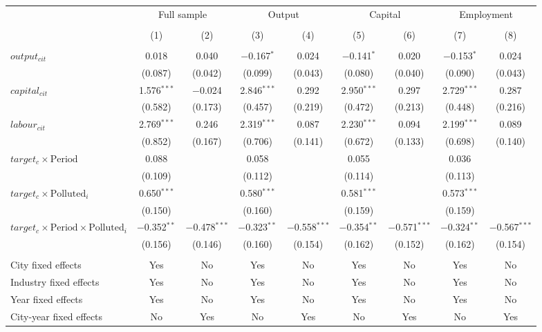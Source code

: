 \documentclass[12pt]{article}
\begin{document}
\begin{table}[!htb]
\begin{adjustbox}{width=\textwidth, totalheight=\baselineskip,keepaspectratio}
\begin{tabular}{@{\extracolsep{5pt}}lcccccccc}
\\[-1.8ex]
            &\multicolumn{2}{c}{Full sample}&\multicolumn{2}{c}{Output}&\multicolumn{2}{c}{Capital}&\multicolumn{2}{c}{Employment}\\
\\[-1.8ex] & (1) & (2) & (3) & (4) & (5) & (6) & (7) & (8)\\ 
\hline \\[-1.8ex] 
  $output_{cit}$ & 0.018 & 0.040 & $-$0.167$^{*}$ & 0.024 & $-$0.141$^{*}$ & 0.020 & $-$0.153$^{*}$ & 0.024 \\ 
  & (0.087) & (0.042) & (0.099) & (0.043) & (0.080) & (0.040) & (0.090) & (0.043) \\ 
  $capital_{cit}$ & 1.576$^{***}$ & $-$0.024 & 2.846$^{***}$ & 0.292 & 2.950$^{***}$ & 0.297 & 2.729$^{***}$ & 0.287 \\ 
  & (0.582) & (0.173) & (0.457) & (0.219) & (0.472) & (0.213) & (0.448) & (0.216) \\ 
  $labour_{cit}$ & 2.769$^{***}$ & 0.246 & 2.319$^{***}$ & 0.087 & 2.230$^{***}$ & 0.094 & 2.199$^{***}$ & 0.089 \\ 
  & (0.852) & (0.167) & (0.706) & (0.141) & (0.672) & (0.133) & (0.698) & (0.140) \\ 
   $target_c \times \text{Period}$  & 0.088 &  & 0.058 &  & 0.055 &  & 0.036 &  \\ 
  & (0.109) &   & (0.112) &   & (0.114) &   & (0.113) &   \\ 
   $target_c \times \text{Polluted}_i$  & 0.650$^{***}$ &  & 0.580$^{***}$ &  & 0.581$^{***}$ &  & 0.573$^{***}$ &  \\ 
  & (0.150) &   & (0.160) &   & (0.159) &   & (0.159) &   \\ 
   $target_c \times \text{Period} \times \text{Polluted}_i$  & $-$0.352$^{**}$ & $-$0.478$^{***}$ & $-$0.323$^{**}$ & $-$0.558$^{***}$ & $-$0.354$^{**}$ & $-$0.571$^{***}$ & $-$0.324$^{**}$ & $-$0.567$^{***}$ \\ 
  & (0.156) & (0.146) & (0.160) & (0.154) & (0.162) & (0.152) & (0.162) & (0.154) \\ 
 \hline \\[-1.8ex] 
City fixed effects & Yes & No & Yes & No & Yes & No & Yes & No \\ 
Industry fixed effects & Yes & No & Yes & No & Yes & No & Yes & No \\ 
Year fixed effects & Yes & No & Yes & No & Yes & No & Yes & No \\ 
City-year fixed effects & No & Yes & No & Yes & No & Yes & No & Yes \\ 

\end{tabular}
\end{adjustbox}
\end{table}
\end{document}
